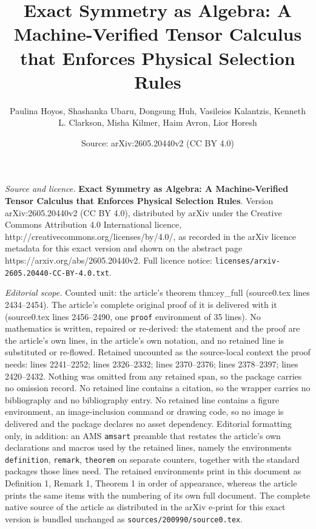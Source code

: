 \documentclass[10pt,a4paper]{amsart}
\title{\textbf{Exact Symmetry as Algebra: A Machine-Verified Tensor Calculus that Enforces Physical Selection Rules}}
\author{Paulina Hoyos, Shashanka Ubaru, Dongsung Huh, Vasileios Kalantzis, Kenneth L. Clarkson, Misha Kilmer, Haim Avron, Lior Horesh}
\date{Source: arXiv:2605.20440v2 (CC BY 4.0)}
\begin{document}
\maketitle

\noindent\emph{Source and licence.} \textbf{Exact Symmetry as Algebra: A Machine-Verified Tensor Calculus that Enforces Physical Selection Rules}. Version arXiv:2605.20440v2 (CC BY 4.0), distributed by arXiv under the Creative Commons Attribution 4.0 International licence, http://creativecommons.org/licenses/by/4.0/, as recorded in the arXiv licence metadata for this exact version and shown on the abstract page https://arxiv.org/abs/2605.20440v2. Full licence notice: \texttt{licenses/arxiv-2605.20440-CC-BY-4.0.txt}.\par\smallskip

\noindent\textit{Editorial scope.} Counted unit: the article's theorem thm:ey\_full (source0.tex lines 2434--2454). The article's complete original proof of it is delivered with it (source0.tex lines 2456--2490, one \texttt{proof} environment of 35 lines). No mathematics is written, repaired or re-derived: the statement and the proof are the article's own lines, in the article's own notation, and no retained line is substituted or re-flowed.  Retained uncounted as the source-local context the proof needs: lines 2241--2252; lines 2326--2332; lines 2370--2376; lines 2378--2397; lines 2420--2432.  Nothing was omitted from any retained span, so the package carries no omission record.  No retained line contains a citation, so the wrapper carries no bibliography and no bibliography entry.  No retained line contains a figure environment, an image-inclusion command or drawing code, so no image is delivered and the package declares no asset dependency.  Editorial formatting only, in addition: an AMS \texttt{amsart} preamble that restates the article's own declarations and macros used by the retained lines, namely the environments \texttt{definition}, \texttt{remark}, \texttt{theorem} on separate counters, together with the standard packages those lines need.  The retained environments print in this document as Definition 1, Remark 1, Theorem 1 in order of appearance, whereas the article prints the same items with the numbering of its own full document.  The complete native source of the article as distributed in the arXiv e-print for this exact version is bundled unchanged as \texttt{sources/200990/source0.tex}.
\end{document}
